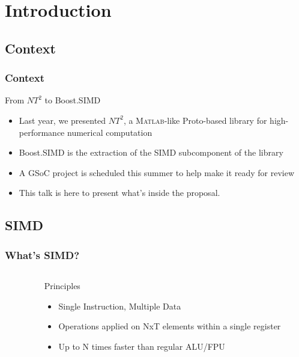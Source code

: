 
\section{Introduction}

\subsection{Context}
\frame
{
  \frametitle{Context}
  \begin{block}{From $NT^2$ to Boost.SIMD}
  \begin{itemize}
  \footnotesize
  \item Last year, we presented $NT^2$, a \textsc{Matlab}-like Proto-based library
		      for high-performance numerical computation
  \item Boost.SIMD is the extraction of the SIMD subcomponent of the
		      library
   \item A GSoC project is scheduled this summer to help make it ready for review 
  \item This talk is here to present what's inside the proposal.
  \end{itemize}
  \end{block}{}
}

\subsection{SIMD}
\frame
{
  \frametitle{What's SIMD?}
  \begin{columns}[c] 
  \begin{column}{6cm} 
  \end{column} 
  \begin{column}{4cm} 
  \begin{block}{Principles}
   \footnotesize
	\begin{itemize}
		\item Single Instruction, Multiple Data
		\item Operations applied on NxT elements within a single register
		\item Up to N times faster than regular ALU/FPU
	\end{itemize}
  \end{block}{}	
  \end{column} 
  \end{columns} 
}

